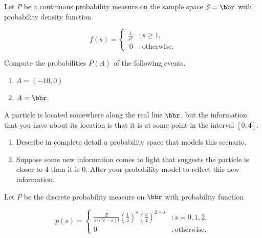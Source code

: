 \documentclass[12pt,reqno]{amsart}
\begin{document}
\newpage
\prob Let $P$ be a continuous probability measure on the sample space $S=\bbr$ with probability density function

    \[f(s) = \begin{cases}
    \displaystyle\frac{1}{s^2} & : s \geq 1, \\\
    0 & : \text{otherwise}.    
    \end{cases}\]

Compute the probabilities $P(A)$ of the following events.

\medskip
\begin{enumerate}
    \item $A=(-10, 0)$\vfill
    


    \item $A = \bbr$.\vfill
    

\end{enumerate}









\prob A particle is located somewhere along the real line $\bbr$, but the  information that you have about its location is that it is at some point in the interval $[0,4]$.

\medskip
\begin{enumerate}
    \item Describe in complete detail a probability space that models this scenario.\vfill


    \item Suppose some new information comes to light that suggests the particle is closer to $4$ than it is $0$. Alter your probability model to reflect this new information.\vfill
    
    \end{enumerate}
    













\newpage
\prob Let $P$ be the discrete probability measure on $\bbr$ with probability function

    \[p(s) = \begin{cases}
        \frac{2!}{s!(2-s)!} \left( \frac{1}{4} \right)^s \left(\frac{3}{4} \right)^{2-s} & : s=0, 1, 2, \\
        0 & :\text{otherwise}.
    \end{cases}\]
\end{document}
